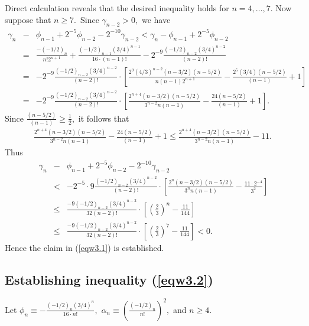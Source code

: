 \documentclass[final,oneeqnum]{siamltex}
\begin{document}
Direct calculation reveals that the desired inequality holds for
$n=4,\dots,7$.
 Now suppose that $n \geq 7$.\ Since $\gamma_{n-2}>0,$ we have
\begin{eqnarray*} 
\gamma_{n}&-& \phi_{n-1} +
2^{-5}\phi_{n-2} -  2^{-10}\gamma_{n-2} < \gamma_{n}- \phi_{n-1}
+ 2^{-5}\phi_{n-2} \nonumber \\
 &=& \frac{-(-1/2)_{n}}{n!2^{n+1}} +\frac{(-1/2)_{n-1}(3/4)^{n-1}}{16\cdot
(n-1)!}
-2^{-9}\frac{(-1/2)_{n-2}(3/4)^{n-2}}{ (n-2)!} \nonumber \\
 &=& -2^{-9}\frac{(-1/2)_{n-2}(3/4)^{n-2}}{(n-2)!}\cdot\left[
\frac{2^9(4/3)^{n-2}(n-3/2)(n-5/2)}{n(n-1)2^{n+1}} -
\frac{2^5(3/4)(n-5/2)}{(n-1)}+1\right] \nonumber \\
 &=& -2^{-9}\frac{(-1/2)_{n-2}(3/4)^{n-2}}{(n-2)!}\cdot\left[
\frac{2^{n+4}(n-3/2)(n-5/2)}{3^{n-2}n(n-1)} -
\frac{24(n-5/2)}{(n-1)}+1\right].
\end{eqnarray*} 
Since $\frac{(n-5/2)}{(n-1)} \geq \frac{1}{2},$ it follows that
\begin{eqnarray}
\frac{2^{n+4}(n-3/2)(n-5/2)}{3^{n-2}n(n-1)} -
\frac{24(n-5/2)}{(n-1)}+1 \leq
\frac{2^{n+4}(n-3/2)(n-5/2)}{3^{n-2}n(n-1)} - 11.\ \nonumber
\end{eqnarray} 
Thus
\begin{eqnarray} 
\gamma_{n}&-& \phi_{n-1} +
2^{-5}\phi_{n-2} -  2^{-10}\gamma_{n-2}\nonumber \\
 &<& -2^{-5}\cdot9\frac{(-1/2)_{n-2}(3/4)^{n-2}}{(n-2)!}\cdot\left[
\frac{2^{n}(n-3/2)(n-5/2)}{3^{n}n(n-1)} - \frac{11\cdot2^{-4}}{3^2}\right] \nonumber \\
&\leq& \frac{-9(-1/2)_{n-2}(3/4)^{n-2}}{32(n-2)!}\cdot\left[
\left(\frac{2}{3}\right)^{n} - \frac{11}{144}\right]  \nonumber \\
&\leq&
\frac{-9(-1/2)_{n-2}(3/4)^{n-2}}{32(n-2)!}\cdot\left[\left(\frac{2}{3}\right
)^{7} - \frac{11}{144}\right] <0.\ \nonumber
\end{eqnarray} 
Hence the  claim in (\ref{eqw3.1}) is established.\,
\qquad\endproof%

\subsection{Establishing inequality (\ref{eqw3.2})}  
Let $\textstyle \phi_{n} \equiv - \frac{(-1/2)_{n}(3/4)^n}{16\cdot n!},$
$\textstyle \alpha_{n} \equiv (\frac{(-1/2)_{n}}{n!})^2,$ and
$n\geq 4$.
\end{document}
